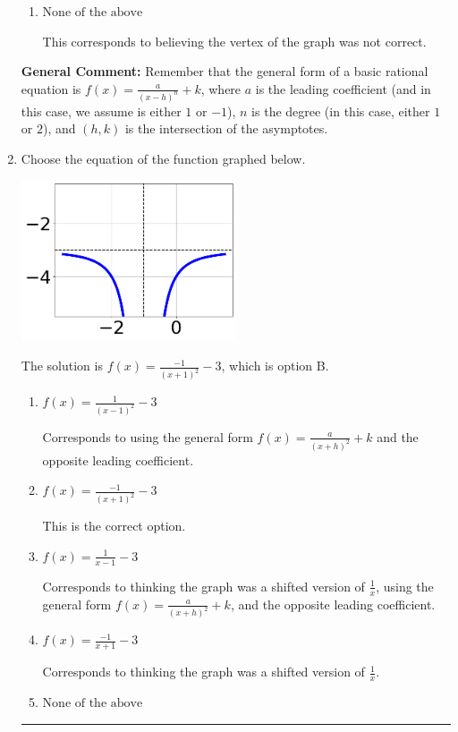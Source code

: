 \documentclass{extbook}[14pt]
\newcommand{\litem}[1]{\item #1

\rule{\textwidth}{0.4pt}}
\begin{document}
\begin{enumerate}
{\begin{enumerate}[label=\Alph*.]
Corresponds to using the general form $f(x) = \frac{a}{x+h}+k$ and the opposite leading coefficient.
\item \( \text{None of the above} \)

This corresponds to believing the vertex of the graph was not correct.
\end{enumerate}

\textbf{General Comment:} Remember that the general form of a basic rational equation is $ f(x) = \frac{a}{(x-h)^n} + k$, where $a$ is the leading coefficient (and in this case, we assume is either $1$ or $-1$), $n$ is the degree (in this case, either $1$ or $2$), and $(h, k)$ is the intersection of the asymptotes.
}
\litem{
Choose the equation of the function graphed below.

\begin{center}
    \includegraphics[width=0.5\textwidth]{../Figures/rationalGraphToEquationA.png}
\end{center}


The solution is \( f(x) = \frac{-1}{(x + 1)^2} - 3 \), which is option B.\begin{enumerate}[label=\Alph*.]
\item \( f(x) = \frac{1}{(x - 1)^2} - 3 \)

Corresponds to using the general form $f(x) = \frac{a}{(x+h)^2}+k$ and the opposite leading coefficient.
\item \( f(x) = \frac{-1}{(x + 1)^2} - 3 \)

This is the correct option.
\item \( f(x) = \frac{1}{x - 1} - 3 \)

Corresponds to thinking the graph was a shifted version of $\frac{1}{x}$, using the general form $f(x) = \frac{a}{(x+h)^2}+k$, and the opposite leading coefficient.
\item \( f(x) = \frac{-1}{x + 1} - 3 \)

Corresponds to thinking the graph was a shifted version of $\frac{1}{x}$.
\item \( \text{None of the above} \)


\end{enumerate}}
\end{enumerate}
\end{document}
